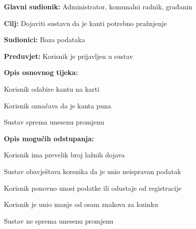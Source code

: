 				
				
					\noindent {}
					\begin{packed_item}
	
						\item \textbf{Glavni sudionik: }Administrator, komunalni radnik, građanin
						\item  \textbf{Cilj:} Dojaviti sustavu da je kanti potrebno pražnjenje
						\item  \textbf{Sudionici:} Baza podataka
						\item  \textbf{Preduvjet:} Korisnik je prijavljen u sustav
						\item  \textbf{Opis osnovnog tijeka:}
						
						\item[] \begin{packed_enum}
	
							\item Korisnik odabire kantu na karti
							\item Korisnik označava da je kanta puna
							\item Sustav sprema unesenu promjenu
							
						\end{packed_enum}
						
						\item  \textbf{Opis mogućih odstupanja:}
						
						\item[] \begin{packed_item}
	
							\item[2.a] Korisnik ima prevelik broj lažnih dojava
							
							\item[] \begin{packed_enum}
								
								\item Sustav obavještava korsnika da je unio neispravan podatak
								\item Korisnik ponovno unosi podatke ili odustaje od registracije
								
							\end{packed_enum}
							\item[2.b] Korisnik je unio manje od osam znakova za lozinku
							
								\item[] \begin{packed_enum}
								
								\item Sustav ne sprema unesenu promjenu
								
							\end{packed_enum}
							
						\end{packed_item}
					\end{packed_item}


